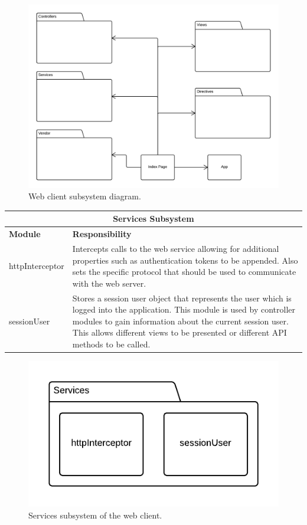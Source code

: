 \documentclass[11pt,a4paper]{report}
\begin{document}
\begin{figure}[H]
\centering
\includegraphics[width=0.8\linewidth]{./img/web-client-uml/subsystem-diagram}
\caption{Web client subsystem diagram.}
\label{fig:subsystem-diagram}
\end{figure}

\begin{center}
\begin{tabular}{|l|p{10cm}|}
\hline \multicolumn{2}{|c|}{\textbf{Services Subsystem}} \\
\hline \textbf{Module} & \textbf{Responsibility} \\ 
\hline httpInterceptor & Intercepts calls to the web service allowing for additional properties such as authentication tokens to be appended. Also sets the specific protocol that should be used to communicate with the web server. \\
\hline sessionUser & Stores a session user object that represents the user which is logged into the application. This module is used by controller modules to gain information about the current session user. This allows different views to be presented or different API methods to be called. \\
\hline
\end{tabular} 
\end{center}

\begin{figure}[H]
\centering
\includegraphics[width=0.8\linewidth]{./img/web-client-uml/services-subsystem-diagram}
\caption{Services subsystem of the web client.}
\label{fig:services-subsystem-diagram}
\end{figure}
\end{document}
